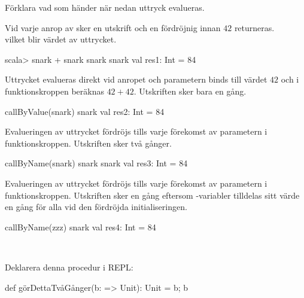 \noindent Förklara vad som händer när nedan uttryck evalueras.

\Subtask {}

\Subtask {}

\Subtask {}

\Subtask {}

\SOLUTION

\TaskSolved \what

\SubtaskSolved Vid varje anrop av  sker en utskrift och en fördröjnig innan $42$ returneras. \\ vilket blir värdet av uttrycket.
\begin{REPL}
scala> snark + snark
snark snark val res1: Int = 84
\end{REPL}

\SubtaskSolved Uttrycket  evalueras direkt vid anropet och parametern  binds till värdet $42$ och i funktionskroppen beräknas $42+42$. Utskriften sker bara en gång.
\begin{REPL}
callByValue(snark)
snark val res2: Int = 84
\end{REPL}

\SubtaskSolved Evalueringen av uttrycket  fördröjs tills varje förekomst av parametern  i funktionskroppen. Utskriften sker två gånger.
\begin{REPL}
callByName(snark)
snark snark val res3: Int = 84
\end{REPL}

\SubtaskSolved Evalueringen av uttrycket  fördröjs tills varje förekomst av parametern  i funktionskroppen. Utskriften sker en gång eftersom -variabler tilldelas sitt värde en gång för alla vid den fördröjda initialiseringen.
\begin{REPL}
callByName(zzz)
snark val res4: Int = 84
\end{REPL}

\QUESTEND





\QUESTBEGIN

\Task  \what~

\Subtask Deklarera denna procedur i REPL:
\begin{Code}
def görDettaTvåGånger(b: => Unit): Unit = { b; b }
\end{Code}

